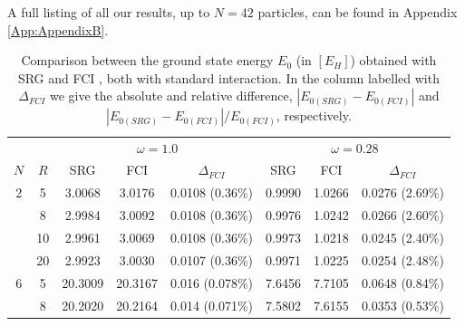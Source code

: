 A full listing of all our results, up to $N=42$ particles, can be found in Appendix \ref{App:AppendixB}.

\begin{table}
\begin{center}
\begin{tabular}{|c|c|c c c|c c c|}
\hline
\multicolumn{2}{|c|}{} &\multicolumn{3}{|c|}{$\omega=1.0$} &
 \multicolumn{3}{|c|}{$\omega=0.28$}\\
$N$ & $R$ & SRG & FCI& $\Delta_{FCI}$ & SRG & FCI& $\Delta_{FCI}$ \\
\hline
2 & 5 & 3.0068 & 3.0176 & 0.0108 (0.36\%) &0.9990 & 1.0266 &  0.0276 (2.69\%) \\
  & 8 & 2.9984 & 3.0092 & 0.0108 (0.36\%) &0.9976 & 1.0242 &  0.0266 (2.60\%)\\
 & 10 & 2.9961 & 3.0069 & 0.0108 (0.36\%) &0.9973 & 1.0218 & 0.0245 (2.40\%) \\
 & 20 & 2.9923 & 3.0030 & 0.0107 (0.36\%) &0.9971 & 1.0225 &  0.0254 (2.48\%) \\
\hline
6 & 5 &20.3009 & 20.3167 & 0.016 (0.078\%)&7.6456 & 7.7105 & 0.0648 (0.84\%)\\
  & 8 &20.2020 & 20.2164 & 0.014 (0.071\%) &7.5802 & 7.6155 & 0.0353 (0.53\%)\\
\hline\hline
\end{tabular}
\end{center}
\caption{Comparison between the ground state energy $E_0$ (in $[E_H]$) obtained with SRG and FCI \cite{Frank}, both with standard interaction. In the column labelled with $\Delta_{FCI}$ we give the absolute and relative difference, $\left|E_{0(SRG)}-E_{0(FCI)}\right|$ and $\left|E_{0(SRG)}-E_{0(FCI)}\right|/E_{0(FCI)}$, respectively.}
\end{table}

